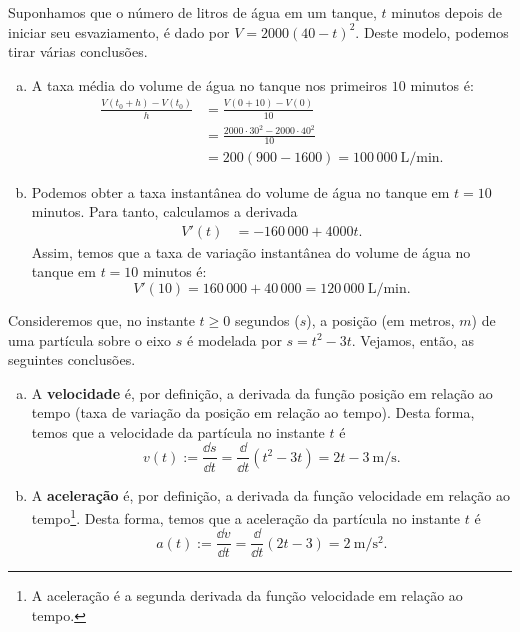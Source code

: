 \begin{ex}
  Suponhamos que o número de litros de água em um tanque, $t$ minutos depois de iniciar seu esvaziamento, é dado por $V = 2000(40-t)^2$. Deste modelo, podemos tirar várias conclusões.
  \begin{enumerate}[a)]
  \item A taxa média do volume de água no tanque nos primeiros $10$ minutos é:
    \begin{align}
      \frac{V(t_0+h)-V(t_0)}{h} &= \frac{V(0+10)-V(0)}{10} \\
                               &= \frac{2000\cdot 30^2-2000\cdot 40^2}{10} \\
                               &= 200(900-1600) = 100\,000 ~ \text{L}/\text{min}.
    \end{align}
  \item Podemos obter a taxa instantânea do volume de água no tanque em $t=10$ minutos. Para tanto, calculamos a derivada
    \begin{align}
      V'(t) &= -160\,000 + 4000t. 
    \end{align}
    Assim, temos que a taxa de variação instantânea do volume de água no tanque em $t=10$ minutos é:
    \begin{equation}
      V'(10) = 160\,000+40\,000 = 120\,000 ~\text{L}/\text{min}.
    \end{equation}
  \end{enumerate}
\end{ex}

\begin{ex}
  Consideremos que, no instante $t\geq 0$ segundos ($s$), a posição (em metros, $m$) de uma partícula sobre o eixo $s$ é modelada por $s = t^2-3t$. Vejamos, então, as seguintes conclusões.
  \begin{enumerate}[a)]
  \item A {\bf velocidade} é, por definição, a derivada da função posição em relação ao tempo (taxa de variação da posição em relação ao tempo). Desta forma, temos que a velocidade da partícula no instante $t$ é
    \begin{equation}
      v(t) := \frac{\dd s}{\dd t} = \frac{\dd}{\dd t}(t^2-3t) = 2t-3 ~ \text{m}/\text{s}.
    \end{equation}
  \item A {\bf aceleração} é, por definição, a derivada da função velocidade em relação ao tempo\footnote{A aceleração é a segunda derivada da função velocidade em relação ao tempo.}. Desta forma, temos que a aceleração da partícula no instante $t$ é
    \begin{equation}
      a(t) := \frac{\dd v}{\dd t} = \frac{\dd}{\dd t}(2t-3) = 2 ~ \text{m}/\text{s}^2.
    \end{equation}
  \end{enumerate}
\end{ex}

